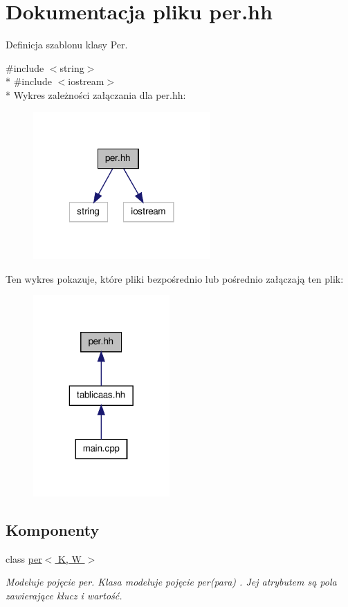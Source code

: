 \hypertarget{per_8hh}{\section{Dokumentacja pliku per.\-hh}
\label{per_8hh}
}


Definicja szablonu klasy Per.  


{\ttfamily \#include $<$string$>$}\\*
{\ttfamily \#include $<$iostream$>$}\\*
Wykres zależności załączania dla per.\-hh\-:\nopagebreak
\begin{figure}[H]
\begin{center}
\leavevmode
\includegraphics[width=192pt]{per_8hh__incl}
\end{center}
\end{figure}
Ten wykres pokazuje, które pliki bezpośrednio lub pośrednio załączają ten plik\-:\nopagebreak
\begin{figure}[H]
\begin{center}
\leavevmode
\includegraphics[width=148pt]{per_8hh__dep__incl}
\end{center}
\end{figure}
\subsection*{Komponenty}
\begin{DoxyCompactItemize}
\item 
class \hyperlink{classper}{per$<$ K, W $>$}
\begin{DoxyCompactList}\small\item\em Modeluje pojęcie per. Klasa modeluje pojęcie per(para) . Jej atrybutem są pola zawierające klucz i wartość. \end{DoxyCompactList}\end{DoxyCompactItemize}


